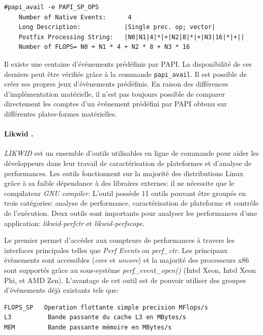 \begin{verbatim}
#papi_avail -e PAPI_SP_OPS
    Number of Native Events:      4
    Long Description:            |Single prec. op; vector|
    Postfix Processing String:   |N0|N1|4|*|+|N2|8|*|+|N3|16|*|+||
    Number of FLOPS= N0 + N1 * 4 + N2 * 8 + N3 * 16
\end{verbatim}

            Il existe une centaine d'évènements prédéfinis par PAPI. La disponibilité de ces derniers peut être vérifiée grâce à la commande \verb|papi_avail|. Il est possible de créer ses propres jeux d'évènements prédéfinis. En raison des différences d'implémentation matérielle, il n'est pas toujours possible de comparer directement les comptes d'un événement prédéfini par PAPI obtenu sur différentes plates-formes matérielles.

        \paragraph{Likwid \cite{Treibig2010}.}
        
            \textit{LIKWID} est un ensemble d'outils utilisables en ligne de commande pour aider les développeurs dans leur travail de caractérisation de plateformes et d'analyse de performances. Les outils fonctionnent sur la majorité des distributions Linux grâce à sa faible dépendance à des libraires externes: il ne nécessite que le compilateur \textit{GNU compiler}. L'outil possède 11 outils pouvant être groupés en trois catégories: analyse de performance, caractérisation de plateforme et contrôle de l'exécution. Deux outils sont importants pour analyser les performances d'une application: \textit{likwid-perfctr} et \textit{likwid-perfscope}.
        
            Le premier permet d'accéder aux compteurs de performances à travers les interfaces principales telles que \textit{Perf Events} ou \textit{perf\_ctr}. Les principaux évènements sont accessibles (\textit{core} et \textit{uncore}) et la majorité des processeurs x86 sont supportés grâce au sous-système \textit{perf\_event\_open()} (Intel Xeon, Intel Xeon Phi, et AMD Zen). L'avantage de cet outil est de pouvoir utiliser des groupes d'évènements déjà existants tels que:

\begin{lstlisting}
FLOPS_SP   Operation flottante simple precision MFlops/s
L3          Bande passante du cache L3 en MBytes/s
MEM         Bande passante mémoire en MBytes/s
\end{lstlisting}

